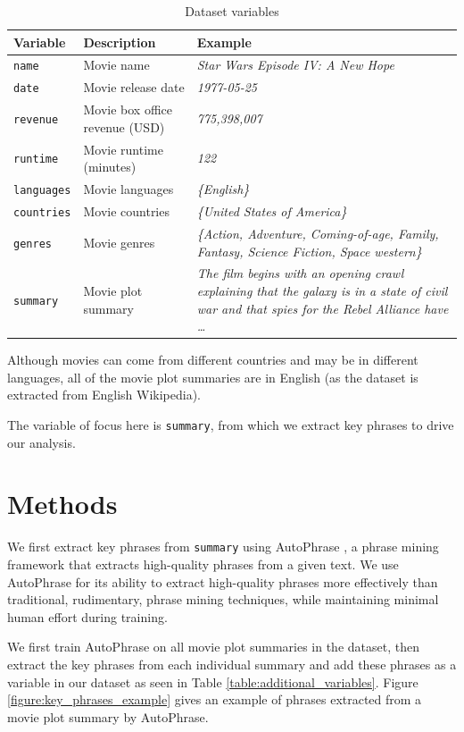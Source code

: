 \documentclass{article}
\begin{document}
\begin{multicols}{2}
\begin{table}
\caption{Dataset variables}
\centering
\begin{tabularx}{.8\textwidth}{llX}
    \textbf{Variable} & \textbf{Description} & \textbf{Example} \\
    \hline
    \texttt{name} & Movie name & \textit{Star Wars Episode IV: A New Hope} \\
    \texttt{date} & Movie release date & \textit{1977-05-25} \\
    \texttt{revenue} & Movie box office revenue (USD) & \textit{775,398,007} \\
    \texttt{runtime} & Movie runtime (minutes) & \textit{122} \\
    \texttt{languages} & Movie languages & \textit{\{English\}} \\
    \texttt{countries} & Movie countries & \textit{\{United States of America\}} \\
    \texttt{genres} & Movie genres & \textit{\{Action, Adventure, Coming-of-age, Family, Fantasy, Science Fiction, Space western\}} \\
    \texttt{summary} & Movie plot summary & \textit{The film begins with an opening crawl explaining that the galaxy is in a state of civil war and that spies for the Rebel Alliance have \ldots} \\
\end{tabularx}
\label{table:variables}
\end{table}

Although movies can come from different countries and may be in different languages, all of the movie plot summaries are in English (as the dataset is extracted from English Wikipedia).

The variable of focus here is \texttt{summary}, from which we extract key phrases to drive our analysis.

\section{Methods} %
We first extract key phrases from \texttt{summary} using AutoPhrase \cite{DBLP:journals/corr/ShangLJRVH17}, a phrase mining framework that extracts high-quality phrases from a given text. We use AutoPhrase for its ability to extract high-quality phrases more effectively than traditional, rudimentary, phrase mining techniques, while maintaining minimal human effort during training.

We first train AutoPhrase on all movie plot summaries in the dataset, then extract the key phrases from each individual summary and add these phrases as a variable in our dataset as seen in Table \ref{table:additional_variables}. Figure \ref{figure:key_phrases_example} gives an example of phrases extracted from a movie plot summary by AutoPhrase.


\end{multicols}
\end{document}
